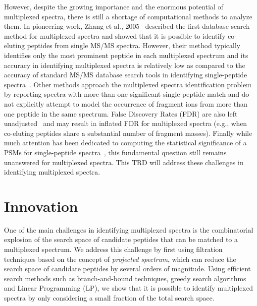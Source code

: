 \documentclass[arial,11pt]{article}
\begin{document}
However, despite the growing importance and the enormous potential of multiplexed spectra, there is still a shortage of computational methods to analyze them. In pioneering work, Zhang et al., 2005~\cite{zhang2005tree} described the first database search method for multiplexed spectra
and showed that it is possible to identify co-eluting peptides from single MS/MS spectra.
However, their method typically
identifies
only the most prominent peptide in each multiplexed spectrum and
its accuracy in identifying multiplexed spectra is relatively low
as compared to the accuracy of standard MS/MS database search tools in  identifying single-peptide spectra~\cite{wang2011peptide}.  Other methods approach the multiplexed spectra identification problem by reporting spectra with more than one significant single-peptide match and do not explicitly attempt to model the occurrence of fragment ions from more than one peptide in the same spectrum.  False Discovery Rates (FDR) are also left unadjusted~\cite{zhang2005tree,kall2007semi,bern2007lookup} and may result in inflated FDR for multiplexed spectra (e.g., when co-eluting peptides share a substantial number of fragment masses).  Finally while much attention has been dedicated to computing the statistical significance of a PSMs for single-peptide spectra~\cite{nesvizhskii2010,gupta11}, this fundamental question still remains  unanswered for multiplexed spectra. This TRD will address these challenges in identifying multiplexed spectra.


\section{Innovation}
One of the main challenges in identifying multiplexed spectra is the combinatorial explosion of the search space of candidate peptides that can be matched to a multiplexed spectrum. We address this challenge by first using filtration techniques based on the concept of {\em projected spectrum}, which can reduce the search space of candidate peptides by several orders of magnitude.  Using efficient search methods such as branch-and-bound techniques, greedy search algorithms and Linear Programming (LP),  we show that it is possible to identify multiplexed spectra by only considering a small fraction of the total search space.
\end{document}
